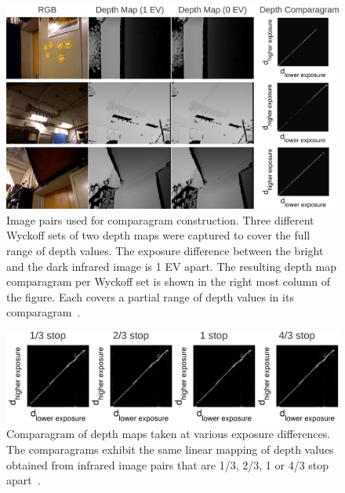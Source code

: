\begin{figure}
\centering 
\includegraphics[width=6.5in]{ch4/diagrams/jason_depth.pdf} 
\caption{Image pairs used for comparagram construction. Three different Wyckoff sets of two depth maps were captured to cover the full range of depth values. The exposure difference between the bright and the dark infrared image is 1 EV apart. The resulting depth map comparagram per Wyckoff set is shown in the right most column of the figure. Each covers a partial range of depth values in its comparagram~\cite{lo2013three}.} 
\label{fig_depth_parts} 
\end{figure}
\begin{figure} 
\centering \includegraphics[width=6.5in]{ch4/diagrams/jason_collection.pdf} 
\caption{Comparagram of depth maps taken at various exposure differences. The comparagrams exhibit the same linear mapping of depth values obtained from infrared image pairs that are 1/3, 2/3, 1 or 4/3 stop apart~\cite{lo2013three}.}
\label{fig_various} 
\end{figure}


